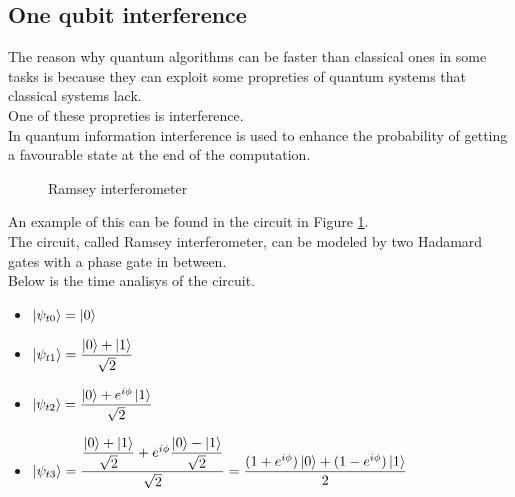 \documentclass{article}
\begin{document}
\subsection{One qubit interference}




The reason why quantum algorithms can be faster than classical ones
in some tasks is because they can exploit some propreties of quantum
systems that classical systems lack. \\
One of these propreties is interference.\\
In quantum information interference is used to enhance the probability of
getting a favourable state at the end of the computation.\\
\vspace{10pt}
\begin{figure}[H]
	\centering
	\caption{Ramsey interferometer}
	\label{interference}
\end{figure}
\vspace{10pt}
An example of this can be found in the circuit in Figure \ref{interference}.\\
The circuit, called Ramsey interferometer, can be modeled by two Hadamard gates with a phase gate
in between.\\
\newpage
Below is the time analisys of the circuit.
\begin{itemize}

	\item $\ket{\psi_{t0}} = \ket{0}$
	\item $\ket{\psi_{t1}} = \dfrac{\ket{0}+\ket{1}}{\sqrt{2}}$
	\item $\ket{\psi_{t2}} = \dfrac{\ket{0}+e^{i\phi}\ket{1}}{\sqrt{2}}$
	\item $\ket{\psi_{t3}} = \dfrac{\dfrac{\ket{0}+\ket{1}}{\sqrt{2}}+e^{i\phi}\dfrac{\ket{0}-\ket{1}}
		      {\sqrt{2}}}{\sqrt{2}}   = \dfrac{(1+e^{i\phi})\ket{0}+(1-e^{i\phi})\ket{1}}{2}$




\end{itemize}
\end{document}
